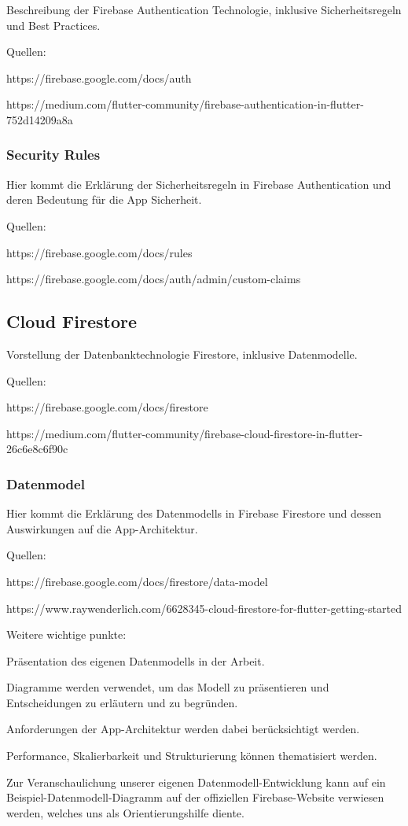 Beschreibung der Firebase Authentication Technologie, inklusive Sicherheitsregeln und Best Practices.

Quellen: 

https://firebase.google.com/docs/auth 

https://medium.com/flutter-community/firebase-authentication-in-flutter-752d14209a8a

\subsubsection{Security Rules}

Hier kommt die Erklärung der Sicherheitsregeln in Firebase Authentication und deren Bedeutung für die App Sicherheit.

Quellen: 

https://firebase.google.com/docs/rules 

https://firebase.google.com/docs/auth/admin/custom-claims

\subsection{Cloud Firestore}

Vorstellung der Datenbanktechnologie Firestore, inklusive Datenmodelle.

Quellen: 

https://firebase.google.com/docs/firestore

https://medium.com/flutter-community/firebase-cloud-firestore-in-flutter-26c6e8c6f90c

\subsubsection{Datenmodel}

Hier kommt die Erklärung des Datenmodells in Firebase Firestore und dessen Auswirkungen auf die App-Architektur.

Quellen: 

https://firebase.google.com/docs/firestore/data-model

https://www.raywenderlich.com/6628345-cloud-firestore-for-flutter-getting-started

Weitere wichtige punkte:

\begin{compactitem}
    \item Präsentation des eigenen Datenmodells in der Arbeit.
    \item Diagramme werden verwendet, um das Modell zu präsentieren und Entscheidungen zu erläutern und zu begründen.
    \item Anforderungen der App-Architektur werden dabei berücksichtigt werden.
    \item Performance, Skalierbarkeit und Strukturierung können thematisiert werden.
    \item Zur Veranschaulichung unserer eigenen Datenmodell-Entwicklung kann auf ein Beispiel-Datenmodell-Diagramm auf der offiziellen Firebase-Website verwiesen werden, welches uns als Orientierungshilfe diente.
\end{compactitem}

